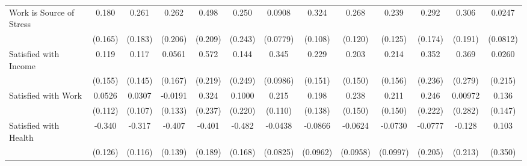 {\begin{tabular}{l*{12}{c}}
\addlinespace
Work is Source of Stress&       0.180         &       0.261         &       0.262         &       0.498\sym{*}  &       0.250         &      0.0908         &       0.324\sym{**} &       0.268\sym{*}  &       0.239         &       0.292         &       0.306         &      0.0247         \\
            &     (0.165)         &     (0.183)         &     (0.206)         &     (0.209)         &     (0.243)         &    (0.0779)         &     (0.108)         &     (0.120)         &     (0.125)         &     (0.174)         &     (0.191)         &    (0.0812)         \\
\addlinespace
Satisfied with Income&       0.119         &       0.117         &      0.0561         &       0.572\sym{**} &       0.144         &       0.345\sym{***}&       0.229         &       0.203         &       0.214         &       0.352         &       0.369         &      0.0260         \\
            &     (0.155)         &     (0.145)         &     (0.167)         &     (0.219)         &     (0.249)         &    (0.0986)         &     (0.151)         &     (0.150)         &     (0.156)         &     (0.236)         &     (0.279)         &     (0.215)         \\
\addlinespace
Satisfied with Work&      0.0526         &      0.0307         &     -0.0191         &       0.324         &      0.1000         &       0.215         &       0.198         &       0.238         &       0.211         &       0.246         &     0.00972         &       0.136         \\
            &     (0.112)         &     (0.107)         &     (0.133)         &     (0.237)         &     (0.220)         &     (0.110)         &     (0.138)         &     (0.150)         &     (0.150)         &     (0.222)         &     (0.282)         &     (0.147)         \\
\addlinespace
Satisfied with Health&      -0.340\sym{**} &      -0.317\sym{**} &      -0.407\sym{**} &      -0.401\sym{*}  &      -0.482\sym{**} &     -0.0438         &     -0.0866         &     -0.0624         &     -0.0730         &     -0.0777         &      -0.128         &       0.103         \\
            &     (0.126)         &     (0.116)         &     (0.139)         &     (0.189)         &     (0.168)         &    (0.0825)         &    (0.0962)         &    (0.0958)         &    (0.0997)         &     (0.205)         &     (0.213)         &     (0.350)         \\

\end{tabular}}
